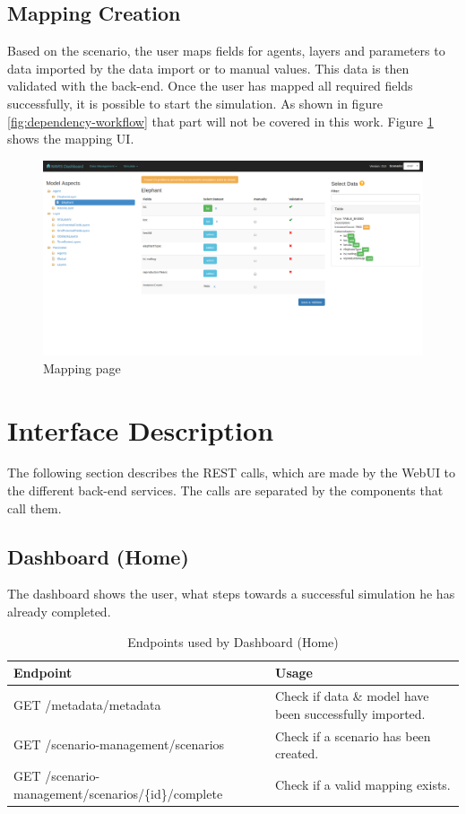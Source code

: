\subsection{Mapping Creation}
Based on the scenario, the user maps fields for agents, layers and parameters to data imported by the data import or to manual values. This data is then validated with the back-end. Once the user has mapped all required fields successfully, it is possible to start the simulation. As shown in figure \ref{fig:dependency-workflow} that part will not be covered in this work. Figure \ref{fig:mapping-screen} shows the mapping UI.
\begin{figure}[H]
	\centering\includegraphics[width=1\textwidth]{res/mapping-screen.png}
	\caption{Mapping page}
	\label{fig:mapping-screen}
\end{figure}



\section{Interface Description}
The following section describes the REST calls, which are made by the WebUI to the different back-end services. The calls are separated by the components that call them.


\subsection{Dashboard (Home)}
The dashboard shows the user, what steps towards a successful simulation he has already completed.
\begin{table}[H]
	\caption{Endpoints used by Dashboard (Home)}
	\begin{tabularx}{\textwidth}{|l|X|}
		\hline
		\textbf{Endpoint} & \textbf{Usage} \\ \hline
		GET /metadata/metadata & Check if data \& model have been successfully imported. \\ \hline
		GET /scenario-management/scenarios & Check if a scenario has been created.\\ \hline
		GET /scenario-management/scenarios/\{id\}/complete & Check if a valid mapping exists.\\ \hline
	\end{tabularx}
\end{table}



